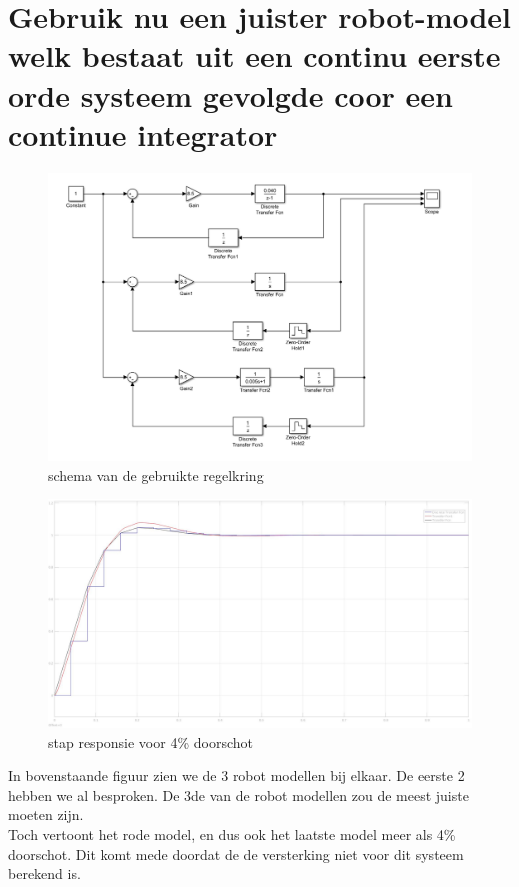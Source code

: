 \documentclass[a4paper, 12pt]{article}
\begin{document}
\section{Gebruik nu een juister robot-model welk bestaat uit een continu eerste orde systeem gevolgde coor een continue integrator}

\begin{figure}[!h]
	\includegraphics[width=1\linewidth]{Labo3_5_systeem3.jpg}
	\caption{schema van de gebruikte regelkring}
\end{figure}

\begin{figure}[H]
	\includegraphics[width=1\linewidth]{Labo3_5_stapresponse4.jpg}
	\caption{stap responsie voor 4\% doorschot}
\end{figure}

In bovenstaande figuur zien we de 3 robot modellen bij elkaar. De eerste 2 hebben we al besproken. De 3de van de robot modellen zou de meest juiste moeten zijn. \\
Toch vertoont het rode model, en dus ook het laatste model meer als 4\% doorschot. Dit komt mede doordat de de versterking niet voor dit systeem berekend is.
\end{document}
